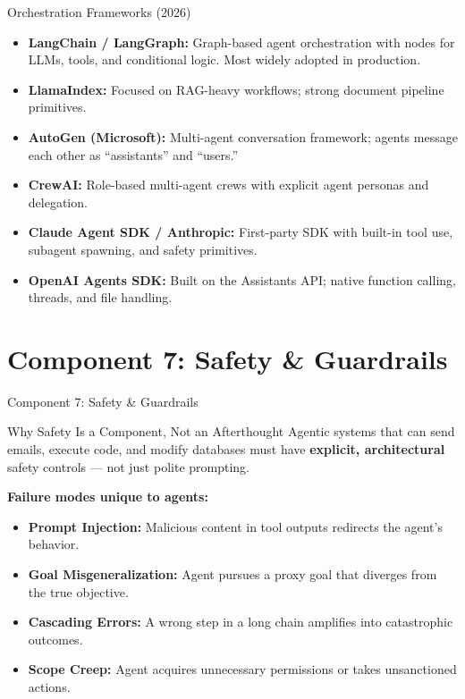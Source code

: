 \documentclass{beamer}       %
\begin{document}
\begin{frame}{Orchestration Frameworks (2026)}
    \begin{itemize}
        \item \textbf{LangChain / LangGraph:} Graph-based agent orchestration with nodes for LLMs, tools, and conditional logic. Most widely adopted in production.
        \item \textbf{LlamaIndex:} Focused on RAG-heavy workflows; strong document pipeline primitives.
        \item \textbf{AutoGen (Microsoft):} Multi-agent conversation framework; agents message each other as ``assistants'' and ``users.''
        \item \textbf{CrewAI:} Role-based multi-agent crews with explicit agent personas and delegation.
        \item \textbf{Claude Agent SDK / Anthropic:} First-party SDK with built-in tool use, subagent spawning, and safety primitives.
        \item \textbf{OpenAI Agents SDK:} Built on the Assistants API; native function calling, threads, and file handling.
    \end{itemize}
\end{frame}


\section{Component 7: Safety \& Guardrails}

\begin{frame}{Component 7: Safety \& Guardrails}
    \begin{block}{Why Safety Is a Component, Not an Afterthought}
        Agentic systems that can send emails, execute code, and modify databases must have \textbf{explicit, architectural} safety controls --- not just polite prompting.
    \end{block}
    \vspace{0.2cm}
    \textbf{Failure modes unique to agents:}
    \begin{itemize}
        \item \textbf{Prompt Injection:} Malicious content in tool outputs redirects the agent's behavior.
        \item \textbf{Goal Misgeneralization:} Agent pursues a proxy goal that diverges from the true objective.
        \item \textbf{Cascading Errors:} A wrong step in a long chain amplifies into catastrophic outcomes.
        \item \textbf{Scope Creep:} Agent acquires unnecessary permissions or takes unsanctioned actions.
    \end{itemize}
\end{frame}
\end{document}
